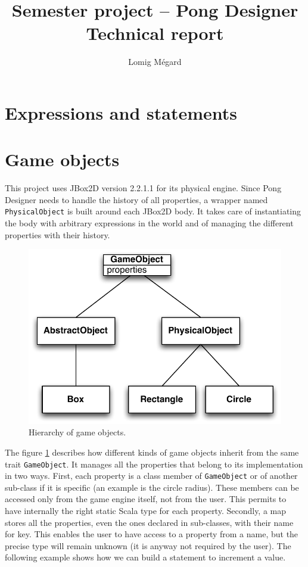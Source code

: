 \documentclass[11pt,a4paper]{article}
\title{Semester project -- Pong Designer\\Technical report}
\author{Lomig Mégard}
\begin{document}
\maketitle

\section{Expressions and statements}


\section{Game objects}
This project uses JBox2D version 2.2.1.1 for its physical engine. Since Pong Designer needs to handle the history of all properties, a wrapper named \texttt{PhysicalObject} is built around each JBox2D body. It takes care of instantiating the body with arbitrary expressions in the world and of managing the different properties with their history. 

\begin{figure}[h]
\centering
\includegraphics[scale = 0.7]{images/objects} 
\caption{Hierarchy of game objects.}
\label{fig:objects}
\end{figure}

The figure \ref{fig:objects} describes how different kinds of game objects inherit from the same trait \texttt{GameObject}. It manages all the properties that belong to its implementation in two ways. First, each property is a class member of \texttt{GameObject} or of another sub-class if it is specific (an example is the circle radius). These members can be accessed only from the game engine itself, not from the user. This permits to have internally the right static Scala type for each property. Secondly, a map stores all the properties, even the ones declared in sub-classes, with their name for key. This enables the user to have access to a property from a name, but the precise type will remain unknown (it is anyway not required by the user). The following example shows how we can build a statement to increment a value.
\end{document}
